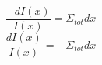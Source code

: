 \documentclass[../main.tex]{subfiles}%
\begin{document}
%
    \Xequation%
    \begin{equation}%
        \dfrac{-dI(x)}{I(x)} = \Sigma_{tot} dx%
    \end{equation}%
    \begin{equation}%
        \dfrac{dI(x)}{I(x)} = -\Sigma_{tot} dx%
    \end{equation}%
\end{document}
